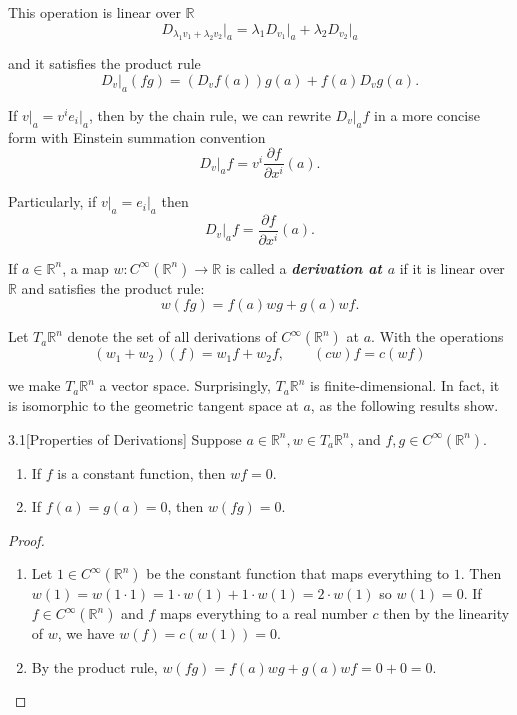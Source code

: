 This operation is linear over \( \mathbb{R} \)
\[
    D_{\lambda_{1}v_{1} + \lambda_{2}v_{2}}\vert_{a} = \lambda_{1} D_{v_{1}}\vert_{a} + \lambda_{2} D_{v_{2}}\vert_{a}
\]

and it satisfies the product rule
\[
    D_{v}\vert_{a}(fg) = (D_{v}f(a)) g(a) + f(a) D_{v}g(a).
\]

If \( v\vert_{a} = v^{i} e_{i}\vert_{a} \), then by the chain rule, we can rewrite \( D_{v}\vert_{a}f \) in a more concise form with Einstein summation convention
\[
    D_{v}\vert_{a}f = v^{i}\dfrac{\partial f}{\partial x^{i}}(a).
\]

Particularly, if \( v\vert_{a} = e_{i}\vert_{a} \) then
\[
    D_{v}\vert_{a}f = \dfrac{\partial f}{\partial x^{i}}(a).
\]

If \( a \in \mathbb{R}^{n} \), a map \( w: C^{\infty}(\mathbb{R}^{n}) \to \mathbb{R} \) is called a \emph{\textbf{derivation at \(a\)}} if it is linear over \( \mathbb{R} \) and satisfies the product rule:
\[
    w(fg) = f(a) wg + g(a) wf.
\]

Let \( T_{a}\mathbb{R}^{n} \) denote the set of all derivations of \( C^{\infty}(\mathbb{R}^{n}) \) at \( a \). With the operations
\[
    (w_{1} + w_{2})(f) = w_{1}f + w_{2}f, \qquad (cw)f = c(wf)
\]

we make \( T_{a}\mathbb{R}^{n} \) a vector space. Surprisingly, \( T_{a}\mathbb{R}^{n} \) is finite-dimensional. In fact, it is isomorphic to the geometric tangent space at \( a \), as the following results show.

\begin{lemma}{3.1}[Properties of Derivations]
    Suppose \( a \in \mathbb{R}^{n}, w \in T_{a}\mathbb{R}^{n} \), and \( f, g \in C^{\infty}(\mathbb{R}^{n}) \).
    \begin{enumerate}[label={(\alph*)},itemsep=0pt]
        \item If \( f \) is a constant function, then \( wf = 0 \).
        \item If \( f(a) = g(a) = 0 \), then \( w(fg) = 0 \).
    \end{enumerate}
\end{lemma}

\begin{proof}
    \begin{enumerate}[label={(\alph*)},itemsep=0pt]
        \item Let \( 1 \in C^{\infty}(\mathbb{R}^{n}) \) be the constant function that maps everything to \( 1\). Then \( w(1) = w(1 \cdot 1) = 1\cdot w(1) + 1\cdot w(1) = 2\cdot w(1) \) so \( w(1) = 0 \). If \( f \in C^{\infty}(\mathbb{R}^{n}) \) and \( f \) maps everything to a real number \( c \) then by the linearity of \( w \), we have \( w(f) = c(w(1)) = 0 \).
        \item By the product rule, \( w(fg) = f(a) wg + g(a) wf = 0 + 0 = 0 \).
    \end{enumerate}
\end{proof}

